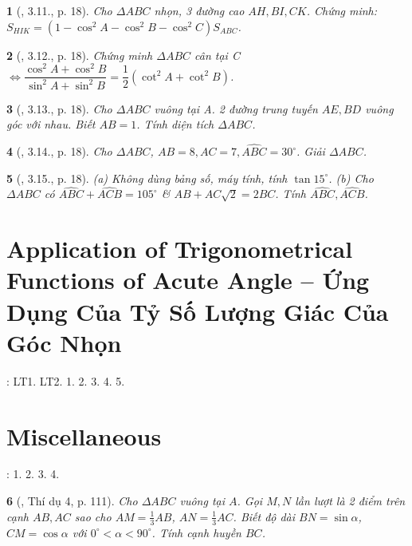 \documentclass{article}
\newtheorem{baitoan}{}
\begin{document}
\begin{baitoan}[\cite{TLCT_THCS_Toan_9_hinh_hoc}, 3.11., p. 18]
	Cho $\Delta ABC$ nhọn, 3 đường cao $AH,BI,CK$. Chứng minh: $S_{HIK} = (1 - \cos^2A - \cos^2B - \cos^2C)S_{ABC}$.
\end{baitoan}

\begin{baitoan}[\cite{TLCT_THCS_Toan_9_hinh_hoc}, 3.12., p. 18]
	Chứng minh $\Delta ABC$ cân tại C $\Leftrightarrow\dfrac{\cos^2A + \cos^2B}{\sin^2A + \sin^2B} = \dfrac{1}{2}(\cot^2A + \cot^2B)$.
\end{baitoan}

\begin{baitoan}[\cite{TLCT_THCS_Toan_9_hinh_hoc}, 3.13., p. 18]
	Cho $\Delta ABC$ vuông tại A. 2 đường trung tuyến $AE,BD$ vuông góc với nhau. Biết $AB = 1$. Tính diện tích $\Delta ABC$.
\end{baitoan}

\begin{baitoan}[\cite{TLCT_THCS_Toan_9_hinh_hoc}, 3.14., p. 18]
	Cho $\Delta ABC$, $AB = 8,AC = 7,\widehat{ABC} = 30^\circ$. Giải $\Delta ABC$.
\end{baitoan}

\begin{baitoan}[\cite{TLCT_THCS_Toan_9_hinh_hoc}, 3.15., p. 18]
	(a) Không dùng bảng số, máy tính, tính $\tan15^\circ$. (b) Cho $\Delta ABC$ có $\widehat{ABC} + \widehat{ACB} = 105^\circ$ \& $AB + AC\sqrt{2} = 2BC$. Tính $\widehat{ABC},\widehat{ACB}$.
\end{baitoan}


\section{Application of Trigonometrical Functions of Acute Angle -- Ứng Dụng Của Tỷ Số Lượng Giác Của Góc Nhọn}
\cite[Chap. IV, \S3, pp. 88--91]{SGK_Toan_9_Canh_Dieu_tap_1}: LT1. LT2. 1. 2. 3. 4. 5.


\section{Miscellaneous}
\cite[BTCCIV, pp. 92--93]{SGK_Toan_9_Canh_Dieu_tap_1}: 1. 2. 3. 4.

\begin{baitoan}[\cite{Tuyen_Toan_9_old}, Thí dụ 4, p. 111]
	Cho $\Delta ABC$ vuông tại $A$. Gọi $M,N$ lần lượt là 2 điểm trên cạnh $AB,AC$ sao cho $AM = \frac{1}{3}AB$, $AN = \frac{1}{3}AC$. Biết độ dài $BN = \sin\alpha$, $CM = \cos\alpha$ với $0^\circ < \alpha < 90^\circ$. Tính cạnh huyền $BC$.
\end{baitoan}
\end{document}
